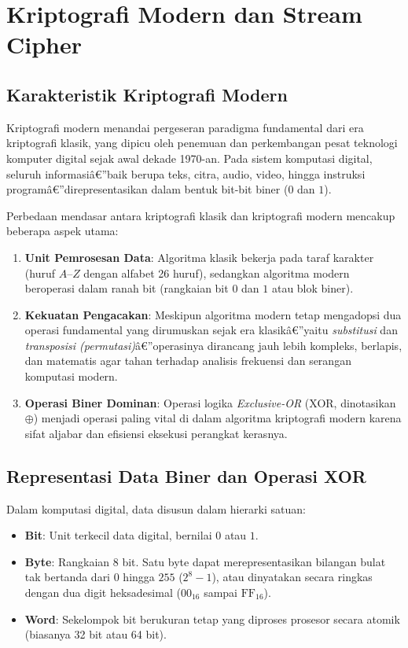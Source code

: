 ﻿\section{Kriptografi Modern dan Stream Cipher}

\subsection{Karakteristik Kriptografi Modern}

Kriptografi modern menandai pergeseran paradigma fundamental dari era kriptografi klasik, yang dipicu oleh penemuan dan perkembangan pesat teknologi komputer digital sejak awal dekade 1970-an. Pada sistem komputasi digital, seluruh informasiâ€”baik berupa teks, citra, audio, video, hingga instruksi programâ€”direpresentasikan dalam bentuk bit-bit biner ($0$ dan $1$).

Perbedaan mendasar antara kriptografi klasik dan kriptografi modern mencakup beberapa aspek utama:
\begin{enumerate}
  \item \textbf{Unit Pemrosesan Data}: Algoritma klasik bekerja pada taraf karakter (huruf $A$--$Z$ dengan alfabet 26 huruf), sedangkan algoritma modern beroperasi dalam ranah bit (rangkaian bit $0$ dan $1$ atau blok biner).
  \item \textbf{Kekuatan Pengacakan}: Meskipun algoritma modern tetap mengadopsi dua operasi fundamental yang dirumuskan sejak era klasikâ€”yaitu \textit{substitusi} dan \textit{transposisi (permutasi)}â€”operasinya dirancang jauh lebih kompleks, berlapis, dan matematis agar tahan terhadap analisis frekuensi dan serangan komputasi modern.
  \item \textbf{Operasi Biner Dominan}: Operasi logika \textit{Exclusive-OR} (XOR, dinotasikan $\oplus$) menjadi operasi paling vital di dalam algoritma kriptografi modern karena sifat aljabar dan efisiensi eksekusi perangkat kerasnya.
\end{enumerate}

\subsection{Representasi Data Biner dan Operasi XOR}

Dalam komputasi digital, data disusun dalam hierarki satuan:
\begin{itemize}
  \item \textbf{Bit}: Unit terkecil data digital, bernilai $0$ atau $1$.
  \item \textbf{Byte}: Rangkaian 8 bit. Satu byte dapat merepresentasikan bilangan bulat tak bertanda dari $0$ hingga $255$ ($2^8 - 1$), atau dinyatakan secara ringkas dengan dua digit heksadesimal ($00_{16}$ sampai $\text{FF}_{16}$).
  \item \textbf{Word}: Sekelompok bit berukuran tetap yang diproses prosesor secara atomik (biasanya 32 bit atau 64 bit).
\end{itemize}

